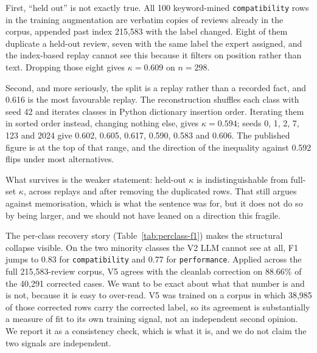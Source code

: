 \documentclass[sigconf, anonymous]{acmart}
\begin{document}
First, ``held out'' is not exactly true. All 100 keyword-mined \texttt{compatibility} rows in the
training augmentation are verbatim copies of reviews already in the corpus, appended past index
215{,}583 with the label changed. Eight of them duplicate a held-out review, seven with the same
label the expert assigned, and the index-based replay cannot see this because it filters on
position rather than text. Dropping those eight gives $\kappa = 0.609$ on $n = 298$.

Second, and more seriously, the split is a replay rather than a recorded fact, and 0.616 is the
most favourable replay. The reconstruction shuffles each class with seed 42 and iterates classes
in Python dictionary insertion order. Iterating them in sorted order instead, changing nothing
else, gives $\kappa = 0.594$; seeds 0, 1, 2, 7, 123 and 2024 give 0.602, 0.605, 0.617, 0.590,
0.583 and 0.606. The published figure is at the top of that range, and the direction of the
inequality against 0.592 flips under most alternatives.

What survives is the weaker statement: held-out $\kappa$ is indistinguishable from full-set
$\kappa$, across replays and after removing the duplicated rows. That still argues against
memorisation, which is what the sentence was for, but it does not do so by being larger, and we
should not have leaned on a direction this fragile.

The per-class recovery story (Table~\ref{tab:perclass-f1}) makes the structural collapse visible. On the two minority classes the V2 LLM cannot see at all, F1 jumps to 0.83 for \texttt{compatibility} and 0.77 for \texttt{performance}. Applied across the full 215{,}583-review corpus, V5 agrees with the cleanlab correction on
88.66\% of the 40{,}291 corrected cases. We want to be exact about what that number is and is
not, because it is easy to over-read. V5 was trained on a corpus in which 38{,}985 of those
corrected rows carry the corrected label, so its agreement is substantially a measure of fit to
its own training signal, not an independent second opinion. We report it as a consistency check,
which is what it is, and we do not claim the two signals are independent.
\end{document}
